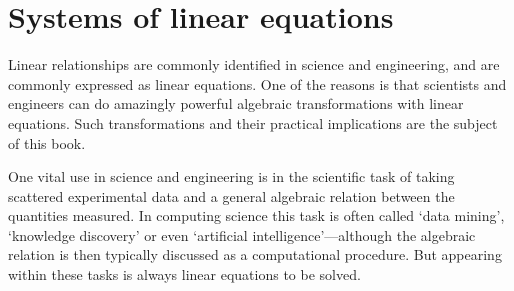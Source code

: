 
\chapter{Systems of linear equations}
\label{ch:sle}
\minitoc


Linear relationships are commonly identified in science and engineering, and are commonly expressed as linear equations.
One of the reasons is that scientists and engineers can do amazingly powerful algebraic transformations with linear equations.
Such transformations and their practical implications are the subject of this book.

One vital use in science and engineering is in the scientific task of taking scattered experimental data and  a general algebraic relation between the quantities measured.
In computing science this task is often called `data mining', `knowledge discovery' or even `artificial intelligence'---although  the algebraic relation is then typically discussed as a computational procedure.
But appearing within these tasks is always linear equations to be solved.

